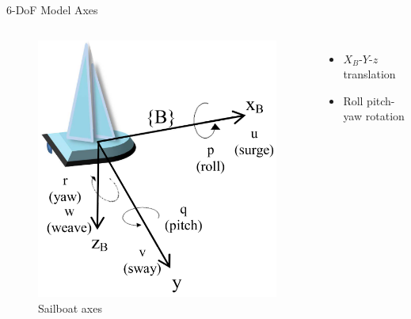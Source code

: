 \documentclass[10pt,xcolor={table,dvipsnames},t]{beamer}
\begin{document}
\begin{frame}{6-DoF Model Axes}
\begin{columns}
\begin{figure}
    \centering
    \includegraphics[width = \linewidth, height = \textheight, keepaspectratio]{documents/figures/alves_rpy.png}
    \caption{Sailboat axes~\cite{Alves2010}}
    \label{fig:my_label}
\end{figure}
\begin{itemize}
    \item  \(X_B\)-\(Y\)-\(z\) translation
    \item Roll \-pitch-yaw rotation
\end{itemize}
\end{columns}

    
\end{frame}
\end{document}
